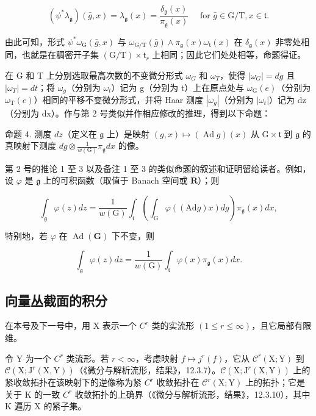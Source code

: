 \[
(\psi^ {*} \lambda_ {\mathfrak {g}}) (\bar {g}, x) = \lambda_ {\mathfrak {g}} (x) = \frac {\delta_ {\mathfrak {g}} (x)}{\pi_ {\mathfrak {g}} (x)} \quad \text { for } \bar {g} \in \mathrm{G/T}, x \in \mathfrak {t}.
\]

由此可知，形式 \(\psi^{*}\omega_{\mathrm{G}}(\bar{g},x)\) 与 \(\omega_{\mathrm{G / T}}(\bar{g})\wedge \pi_{\mathfrak{g}}(x)\omega_{\mathfrak{t}}(x)\) 在 \(\delta_{\mathfrak{g}}(x)\) 非零处相同，也就是在稠密开子集 \((\mathrm{G / T})\times \mathfrak{t}_r\) 上相同；因此它们处处相等，命题得证。

在 G 和 T 上分别选取最高次数的不变微分形式 \(\omega_{G}\) 和 \(\omega_{T}\)，使得 \(|\omega_{G}| = dg\) 且 \(|\omega_{T}| = dt\)；将 \(\omega_{g}\)（分别为 \(\omega_{t}\)）记为 g（分别为 t）上在原点处与 \(\omega_{\mathrm{G}}(e)\)（分别为 \(\omega_{\mathrm{T}}(e)\)）相同的平移不变微分形式，并将 Haar 测度 \(|\omega_{g}|\)（分别为 \(|\omega_{t}|\)）记为 dz（分别为 dx）。作与第 2 号类似并作相应修改的推理，得到以下命题：

命题 4. 测度 \(dz\)（定义在 \(\mathfrak{g}\) 上）是映射 \((g,x)\mapsto (\operatorname {Ad}g)(x)\) 从 \(\mathrm{G}\times \mathfrak{t}\) 到 \(\mathfrak{g}\) 的真映射下测度 \(dg\otimes \frac{1}{w(\mathrm{G})}\pi_{\mathfrak{g}}dx\) 的像。

第 2 号的推论 1 至 3 以及备注 1 至 3 的类似命题的叙述和证明留给读者。例如，设 \(\varphi\) 是 \(\mathfrak{g}\) 上的可积函数（取值于 Banach 空间或 \(\overline{\mathbf{R}}\)）；则

\[
\int_ {\mathfrak {g}} \varphi (z) d z = \frac {1}{w (\mathrm{G})} \int_ {\mathfrak {t}} \left(\int_ {\mathrm{G}} \varphi ((\mathrm{Ad} g) x) d g\right) \pi_ {\mathfrak {g}} (x) d x,\tag{12}
\]

特别地，若 \(\varphi\) 在 \(\operatorname{Ad}(\mathbf{G})\) 下不变，则

\[
\int_ {\mathfrak {g}} \varphi (z) d z = \frac {1}{w (\mathrm{G})} \int_ {\mathfrak {t}} \varphi (x) \pi_ {\mathfrak {g}} (x) d x.\tag{13}
\]

\subsection{向量丛截面的积分}

在本号及下一号中，用 X 表示一个 \(C^{r}\) 类的实流形 \((1 \leq r \leq \infty)\)，且它局部有限维。

令 Y 为一个 \(C^{r}\) 类流形。若 \(r < \infty\)，考虑映射 \(f \mapsto j^{r}(f)\)，它从 \(\mathcal{C}^{r}(\mathrm{X};\mathrm{Y})\) 到 \(\mathcal{C}(\mathrm{X};\mathrm{J}^{r}(\mathrm{X},\mathrm{Y}))\)（《微分与解析流形，结果》，12.3.7）。\(\mathcal{C}(\mathrm{X};\mathrm{J}^{r}(\mathrm{X},\mathrm{Y}))\) 上的紧收敛拓扑在该映射下的逆像称为紧 \(C^{r}\) 收敛拓扑在 \(\mathcal{C}^{r}(\mathrm{X};\mathrm{Y})\) 上的拓扑；它是关于 K 的一致 \(C^{r}\) 收敛拓扑的上确界（《微分与解析流形，结果》，12.3.10），其中 K 遍历 X 的紧子集。

